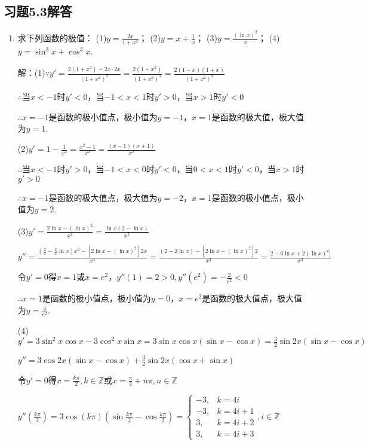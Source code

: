 \documentclass[12pt,UTF8]{ctexart}
\begin{document}
\subsection{习题5.3解答}
\begin{enumerate}
\item 求下列函数的极值：
\newline
(1)$y=\frac{2x}{1+x^2}$；
\newline
(2)$y=x+\frac1x$；
\newline
(3)$y=\frac{(\ln x)^2}x$；
\newline
(4)$y=\sin^3x+\cos^3x$.

解：(1)$\because y'=\frac{2(1+x^2)-2x\cdot2x}{(1+x^2)^2}=\frac{2(1-x^2)}{(1+x^2)^2}=\frac{2(1-x)(1+x)}{(1+x^2)^2}$

$\therefore$当$x<-1$时$y'<0$，当$-1<x<1$时$y'>0$，当$x>1$时$y'<0$

$\therefore x=-1$是函数的极小值点，极小值为$y=-1$，$x=1$是函数的极大值，极大值为$y=1$.

(2)$y'=1-\frac1{x^2}=\frac{x^2-1}{x^2}=\frac{(x-1)(x+1)}{x^2}$

$\therefore$当$x<-1$时$y'>0$，当$-1<x<0$时$y'<0$，当$0<x<1$时$y'<0$，当$x>1$时$y'>0$

$\therefore x=-1$是函数的极大值点，极大值为$y=-2$，$x=1$是函数的极小值点，极小值为$y=2$.

(3)$y'=\frac{2\ln x-(\ln x)^2}{x^2}=\frac{\ln x(2-\ln x)}{x^2}$

$y''=\frac{(\frac2x-\frac2x\ln x)x^2-[2\ln x-(\ln x)^2]2x}{x^4}=\frac{(2-2\ln x)-[2\ln x-(\ln x)^2]2}{x^3}=\frac{2-6\ln x+2(\ln x)^2]}{x^3}$

令$y'=0$得$x=1$或$x=e^2$，$y''(1)=2>0,y''(e^2)=-\frac2{e^2}<0$

$\therefore x=1$是函数的极小值点，极小值为$y=0$，$x=e^2$是函数的极大值点，极大值为$y=\frac4{e^2}$.

(4)$y'=3\sin^2x\cos x-3\cos^2x\sin x=3\sin x\cos x(\sin x-\cos x)=\frac32\sin2x(\sin x-\cos x)$

$y''=3\cos2x(\sin x-\cos x)+\frac32\sin2x(\cos x+\sin x)$

令$y'=0$得$x=\frac{k\pi}2,k\in\mathbb Z$或$x=\frac\pi4+n\pi,n\in\mathbb Z$

$y''(\frac{k\pi}2)=3\cos(k\pi)(\sin\frac{k\pi}2-\cos\frac{k\pi}2)=\begin{cases}
-3,&k=4i\\
-3,&k=4i+1\\
3,&k=4i+2\\
3,&k=4i+3
\end{cases},i\in\mathbb Z$


\end{enumerate}
\end{document}
